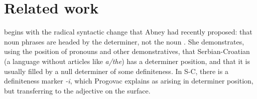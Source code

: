 \documentclass[11pt]{article}\usepackage{graphicx, color}
\begin{document}






\section{Related work}

\citet{progovac:1995} begins with the radical syntactic change that Abney had recently proposed: that noun phrases are headed by the determiner, not the noun \citep{abney:1987}. She demonstrates, using the position of pronouns and other demonstratives, that Serbian-Croatian (a language without articles like \emph{a/the}) has a determiner position, and that it is usually filled by a null determiner of some definiteness. In S-C, there is a definiteness marker \emph{-i}, which Progovac explains as arising in determiner position, but transferring to the adjective on the surface.
\end{document}
